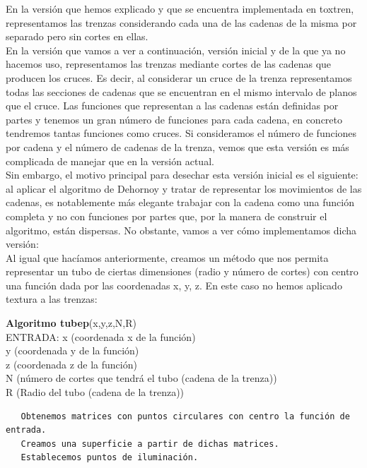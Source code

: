En la versión que hemos explicado y que se encuentra implementada en toxtren, representamos las trenzas considerando cada una de las cadenas de la misma por separado pero sin cortes en ellas. \\
En la versión que vamos a ver a continuación, versión inicial y de la que ya no hacemos uso, representamos las trenzas mediante cortes de las cadenas que producen los cruces. Es decir, al considerar un cruce de la trenza representamos todas las secciones de cadenas que se encuentran en el mismo intervalo de planos que el cruce. Las funciones que representan a las cadenas están definidas por partes y tenemos un gran número de funciones para cada cadena, en concreto tendremos tantas funciones como cruces. Si consideramos el número de funciones por cadena y el número de cadenas de la trenza, vemos que esta versión es más complicada de manejar que en la versión actual.\\

Sin embargo, el motivo principal para desechar esta versión inicial es el siguiente: al aplicar el algoritmo de Dehornoy y tratar de representar los movimientos de las cadenas, es notablemente más elegante trabajar con la cadena como una función completa y no con funciones por partes que, por la manera de construir el algoritmo, están dispersas. No obstante, vamos a ver cómo implementamos dicha versión:\\

\bigskip
Al igual que hacíamos anteriormente, creamos un método que nos permita representar un tubo de ciertas dimensiones (radio y número de cortes) con centro una función dada por las coordenadas x, y, z. En este caso no hemos  aplicado textura a las trenzas:
 \begin{alg}
 	\textbf{Algoritmo tubep}(x,y,z,N,R)\\
 	ENTRADA: x (coordenada x de la función)\\
 	\hspace*{2.2cm} y (coordenada y de la función)\\
 	\hspace*{2.2cm} z (coordenada z de la función)\\
 	\hspace*{2.2cm} N (número de cortes que tendrá el tubo (cadena de la trenza))\\
 	\hspace*{2.2cm} R (Radio del tubo (cadena de la trenza))
 	
\begin{lstlisting}
   Obtenemos matrices con puntos circulares con centro la función de entrada.
   Creamos una superficie a partir de dichas matrices.
   Establecemos puntos de iluminación. 	
\end{lstlisting}
 \end{alg}
 
